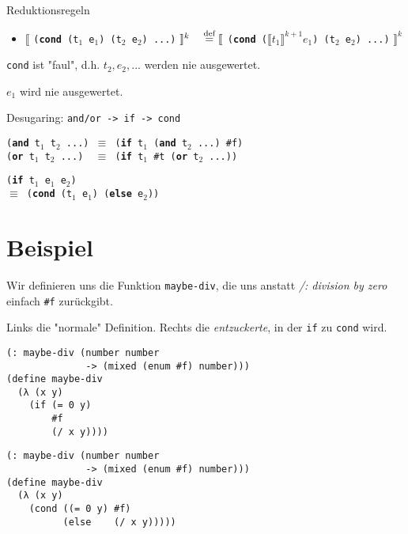 \begin{contentbox}{Reduktionsregeln}
\begin{enumerate}
\begin{itemize}
			      \item $\llbracket$
			            \texttt{(\textbf{cond} (t$_1$ e$_1$) (t$_2$ e$_2$) ...)}
			            $\rrbracket^k \\\quad\overset{\text{def}}{=} \llbracket$
			            \texttt{(\textbf{cond} ($\llbracket t_1 \rrbracket^{k+1} e_1$) (t$_2$ e$_2$) ...)}
			            $\rrbracket^k$ \hfill {}
		      \end{itemize}
		      \begin{infobox}{\texttt{cond} ist "faul", d.h.}
			       $t_2, e_2, ...$ werden nie ausgewertet.

			       $e_1$ wird nie ausgewertet.
		      \end{infobox}
	\end{enumerate}
\end{contentbox}

\begin{contentbox}{Desugaring: \texttt{and/or -> if -> cond}}
	\begin{minipage}[t]{.5\linewidth}
		\texttt{(\textbf{and} t$_1$ t$_2$ ...) $\equiv$ (\textbf{if} t$_1$ (\textbf{and} t$_2$ ...) \#f)} \\
		\texttt{(\textbf{or} t$_1$ t$_2$ ...)~ $\equiv$ (\textbf{if} t$_1$ \#t (\textbf{or} t$_2$ ...))}
	\end{minipage}%
	\begin{minipage}[t]{.5\linewidth}
		\texttt{(\textbf{if} t$_1$ e$_1$ e$_2$)}\\
		\texttt{$\equiv$ (\textbf{cond} (t$_1$ e$_1$) (\textbf{else} e$_2$))}
	\end{minipage}%
\end{contentbox}


\newpage
\section*{Beispiel}

Wir definieren uns die Funktion \texttt{maybe-div}, die uns anstatt
\textit{/: division by zero} einfach \texttt{\#f} zurückgibt.

Links die "normale" Definition. Rechts die \textit{entzuckerte}, in der
\texttt{if} zu \texttt{cond} wird.

\begin{minipage}[t]{.5\linewidth}
	\begin{verbatim}
(: maybe-div (number number 
              -> (mixed (enum #f) number)))
(define maybe-div
  (λ (x y)
    (if (= 0 y)
        #f
        (/ x y))))
\end{verbatim}
\end{minipage}%
\begin{minipage}[t]{.5\linewidth}
	\begin{verbatim}
(: maybe-div (number number
              -> (mixed (enum #f) number)))
(define maybe-div
  (λ (x y)
    (cond ((= 0 y) #f)
          (else    (/ x y)))))
\end{verbatim}
\end{minipage}


